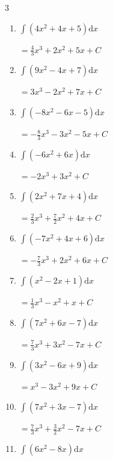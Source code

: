 \begin{multicols}{3}
\begin{enumerate}
  \item $\displaystyle \int \left( 4x^{2}+4x+5 \right) \mathrm{d}x$

        $\displaystyle =\frac{4}{3}x^{3}+2x^{2}+5x+ C$

  \item $\displaystyle \int \left( 9x^{2}-4x+7 \right) \mathrm{d}x$

        $\displaystyle =3x^{3}-2x^{2}+7x+ C$

  \item $\displaystyle \int \left( -8x^{2}-6x-5 \right) \mathrm{d}x$

        $\displaystyle =-\frac{8}{3}x^{3}-3x^{2}-5x+ C$

\columnbreak %

  \item $\displaystyle \int \left( -6x^{2}+6x \right) \mathrm{d}x$

        $\displaystyle =-2x^{3}+3x^{2}+ C$

  \item $\displaystyle \int \left( 2x^{2}+7x+4 \right) \mathrm{d}x$

        $\displaystyle =\frac{2}{3}x^{3}+\frac{7}{2}x^{2}+4x+ C$

  \item $\displaystyle \int \left( -7x^{2}+4x+6 \right) \mathrm{d}x$

        $\displaystyle =-\frac{7}{3}x^{3}+2x^{2}+6x+ C$

  \item $\displaystyle \int \left( x^{2}-2x+1 \right) \mathrm{d}x$

        $\displaystyle =\frac{1}{3}x^{3}-x^{2}+x+ C$

  \item $\displaystyle \int \left( 7x^{2}+6x-7 \right) \mathrm{d}x$

        $\displaystyle =\frac{7}{3}x^{3}+3x^{2}-7x+ C$

  \item $\displaystyle \int \left( 3x^{2}-6x+9 \right) \mathrm{d}x$

        $\displaystyle =x^{3}-3x^{2}+9x+ C$

  \item $\displaystyle \int \left( 7x^{2}+3x-7 \right) \mathrm{d}x$

        $\displaystyle =\frac{7}{3}x^{3}+\frac{3}{2}x^{2}-7x+ C$

  \item $\displaystyle \int \left( 6x^{2}-8x \right) \mathrm{d}x$


\end{enumerate}
\end{multicols}

